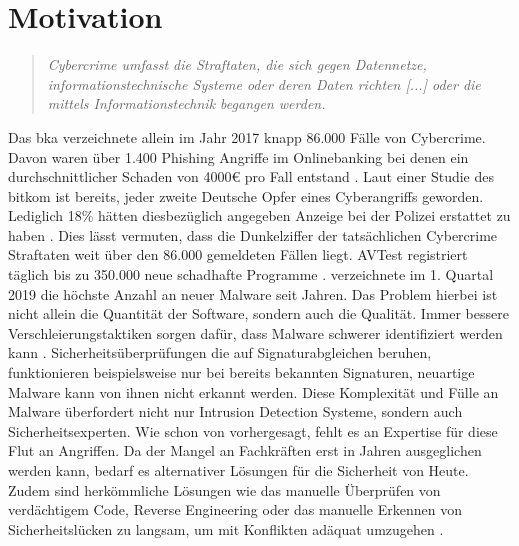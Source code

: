 \documentclass[
    12pt, %
    DIV10,
    ngerman, %
    a4paper, %
    oneside, %
    titlepage, %
    parskip=half, %
    headings=normal, %
    listof=totoc, %
    bibliography=totoc, %
    index=totoc, %
    captions=tableheading, %
    final %
]{scrreprt}
\begin{document}
\section{Motivation}\label{sec:mot}
\begin{quote}
\textsl{Cybercrime umfasst die Straftaten, die sich gegen Datennetze, informationstechnische Systeme
oder deren Daten richten [...] oder die mittels Informationstechnik
begangen werden. \parencite{Cybercrime2017}}
\end{quote}
Das \ac{bka} verzeichnete allein im Jahr 2017 knapp 86.000 Fälle von Cybercrime. Davon waren über 1.400 Phishing Angriffe im Onlinebanking bei denen ein durchschnittlicher Schaden von 4000\euro{} pro Fall entstand \parencite{Cybercrime2017}. Laut einer Studie des \ac{bitkom} ist bereits, jeder zweite Deutsche Opfer eines Cyberangriffs geworden. Lediglich 18\% hätten diesbezüglich angegeben Anzeige bei der Polizei erstattet zu haben \parencite{Bitkome.V.2017}. Dies lässt vermuten, dass die Dunkelziffer der tatsächlichen Cybercrime Straftaten weit über den 86.000 gemeldeten Fällen liegt. AVTest registriert täglich bis zu 350.000 neue schadhafte Programme \parencite{AV-TEST2019}. \textcite{McAfee2019} verzeichnete im 1. Quartal 2019 die höchste Anzahl an neuer Malware seit Jahren. Das Problem hierbei ist nicht allein die Quantität der Software, sondern auch die Qualität. Immer bessere Verschleierungstaktiken sorgen dafür, dass Malware schwerer identifiziert werden kann \parencite{he2017model}. Sicherheitsüberprüfungen die auf Signaturabgleichen beruhen, funktionieren beispielsweise nur bei bereits bekannten Signaturen, neuartige Malware kann von ihnen nicht erkannt werden. Diese Komplexität und Fülle an Malware überfordert nicht nur Intrusion Detection Systeme, sondern auch Sicherheitsexperten. Wie schon von \textcite{Evans2010} vorhergesagt, fehlt es an Expertise für diese Flut an Angriffen. Da der Mangel an Fachkräften erst in Jahren ausgeglichen werden kann, bedarf es alternativer Lösungen für die Sicherheit von Heute. Zudem sind herkömmliche Lösungen wie das manuelle Überprüfen von verdächtigem Code, Reverse Engineering oder das manuelle Erkennen von Sicherheitslücken zu langsam, um mit Konflikten adäquat umzugehen \parencite{Singla2019}.
\\\\ 
\end{document}
